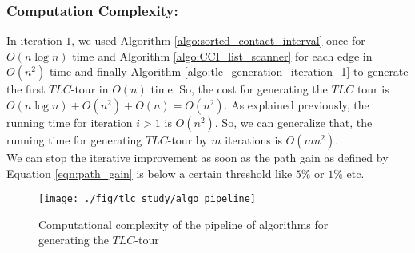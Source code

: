\documentclass{llncs}
\begin{document}
\subsubsection{Computation Complexity: }
In iteration $1$, we used Algorithm \ref{algo:sorted_contact_interval} once for $O(n \log n)$
time and Algorithm \ref{algo:CCI_list_scanner} for each edge in $O(n^2)$ time and finally 
Algorithm \ref{algo:tlc_generation_iteration_1} to generate the first
$TLC$-tour in $O(n)$ time. So, the cost for generating the $TLC$ tour is $O(n \log
n)+O(n^2)+O(n)=O(n^2)$. As explained previously, the running time for iteration $i>1$ is $O(n^2)$.
So, we can generalize that, the running time for generating $TLC$-tour by $m$ iterations is
$O(mn^2)$.\\ 
We can stop the iterative improvement as soon as the path gain as defined by Equation
\ref{eqn:path_gain} is below a certain threshold like $5\%$ or $1\%$ etc.
\begin{figure}[hbt!]    
  \centering   
    \texttt{[image: ./fig/tlc\_study/algo\_pipeline]} 
     \caption{Computational complexity of the pipeline of algorithms for generating the $TLC$-tour}
     \label{fig:algo_pipeline}   
\end{figure}
\end{document}
